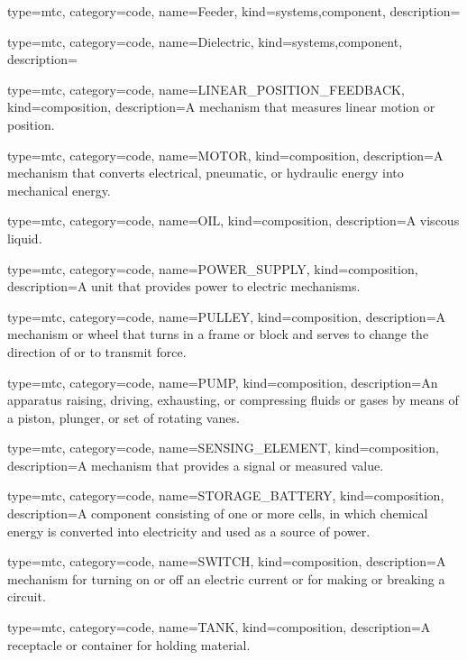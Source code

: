 {
  type=mtc,
  category=code,
  name={Feeder},
  kind={systems,component},
  description={}
}


{
  type=mtc,
  category=code,
  name={Dielectric},
  kind={systems,component},
  description={}
}


{
  type=mtc,
  category=code,
  name={LINEAR\_POSITION\_FEEDBACK},
  kind={composition},
  description={A mechanism that measures linear motion or position.}
}


{
  type=mtc,
  category=code,
  name={MOTOR},
  kind={composition},
  description={A mechanism that converts electrical, pneumatic, or hydraulic energy into mechanical energy.}
}


{
  type=mtc,
  category=code,
  name={OIL},
  kind={composition},
  description={A viscous liquid.}
}


{
  type=mtc,
  category=code,
  name={POWER\_SUPPLY},
  kind={composition},
  description={A unit that provides power to electric mechanisms.}
}


{
  type=mtc,
  category=code,
  name={PULLEY},
  kind={composition},
  description={A mechanism or wheel that turns in a frame or block and serves to change the direction of or to transmit force.}
}


{
  type=mtc,
  category=code,
  name={PUMP},
  kind={composition},
  description={An apparatus raising, driving, exhausting, or compressing fluids or gases by means of a piston, plunger, or set of rotating vanes.}
}


{
  type=mtc,
  category=code,
  name={SENSING\_ELEMENT},
  kind={composition},
  description={A mechanism that provides a signal or measured value.}
}


{
  type=mtc,
  category=code,
  name={STORAGE\_BATTERY},
  kind={composition},
  description={A component consisting of one or more cells, in which chemical energy is converted into electricity and used as a source of power. }
}


{
  type=mtc,
  category=code,
  name={SWITCH},
  kind={composition},
  description={A mechanism for turning on or off an electric current or for making or breaking a circuit.}
}


{
  type=mtc,
  category=code,
  name={TANK},
  kind={composition},
  description={A receptacle or container for holding material.}
}


